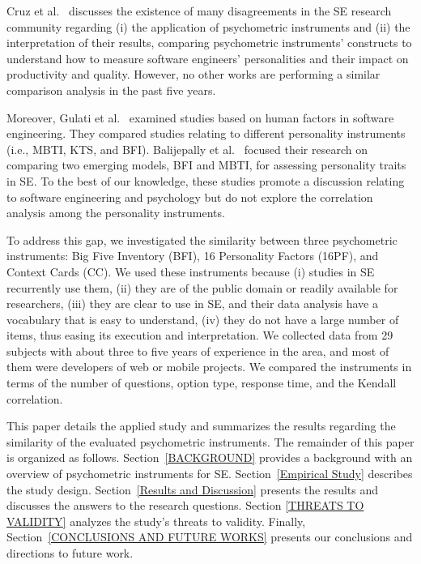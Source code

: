 Cruz et al.~\cite{cruz2015forty} discusses the existence of many disagreements in the SE research community regarding (i) the application of psychometric instruments and (ii) the interpretation of their results, comparing psychometric instruments' constructs to understand how to measure software engineers' personalities and their impact on productivity and quality. However, no other works are performing a similar comparison analysis in the past five years. 

Moreover, Gulati et al.~\cite{gulati2015comparative} examined studies based on human factors in software engineering. They compared studies relating to different personality instruments (i.e., MBTI, KTS, and BFI). Balijepally et al.~\cite{balijepally2006assessing} focused their research on comparing two emerging models, BFI and MBTI, for assessing personality traits in SE. To the best of our knowledge, these studies promote a discussion relating to software engineering and psychology but do not explore the correlation analysis among the personality instruments.

To address this gap, we investigated the similarity between three psychometric instruments: Big Five Inventory (BFI), 16 Personality Factors (16PF), and Context Cards (CC). We used these instruments because (i) studies in SE recurrently use them, (ii) they are of the public domain or readily available for researchers, (iii) they are clear to use in SE, and their data analysis have a vocabulary that is easy to understand, (iv) they do not have a large number of items, thus easing its execution and interpretation. We collected data from 29 subjects with about three to five years of experience in the area, and most of them were developers of web or mobile projects. We compared the instruments in terms of the number of questions, option type, response time, and the Kendall correlation.

This paper details the applied study and summarizes the results regarding the similarity of the evaluated psychometric instruments. The remainder of this paper is organized as follows.  Section~\ref{BACKGROUND} provides a background with an overview of psychometric instruments for SE. Section~\ref{Empirical Study} describes the study design. Section~\ref{Results and Discussion} presents the results and discusses the answers to the research questions.  Section \ref{THREATS TO VALIDITY} analyzes the study's threats to validity. Finally, Section~\ref{CONCLUSIONS AND FUTURE WORKS} presents our conclusions and directions to future work.











